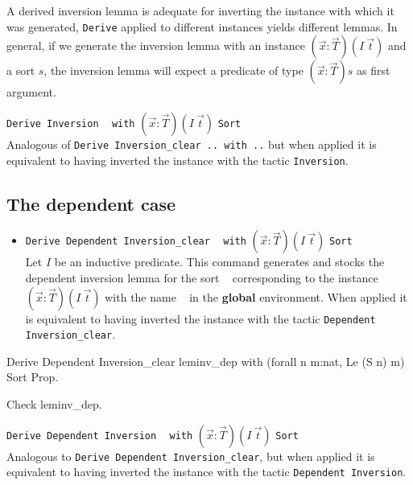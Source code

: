 A derived inversion lemma is  adequate for inverting the instance
with which it was generated,  \texttt{Derive} applied to
different instances yields different lemmas. In general, if we generate
the inversion lemma with 
an instance $(\vec{x}:\vec{T})(I~\vec{t})$ and a sort $s$,  the inversion lemma will
expect a predicate of type $(\vec{x}:\vec{T})s$ as first argument. \\

\begin{Variant}
\item \texttt{Derive Inversion} \ident~ \texttt{with} 
  $(\vec{x}:\vec{T})(I~\vec{t})$ \texttt{Sort} \sort\\ 
     Analogous of \texttt{Derive Inversion\_clear .. with ..} but 
 when applied it is equivalent to having
  inverted the instance with the tactic \texttt{Inversion}.
\end{Variant}

\subsection{The dependent case}
\begin{itemize}
\item \texttt{Derive Dependent Inversion\_clear} \ident~ \texttt{with}
  $(\vec{x}:\vec{T})(I~\vec{t})$ \texttt{Sort} \sort~ \\ 
  Let $I$ be an inductive predicate. This command generates and stocks
  the dependent inversion lemma for the sort  \sort~  corresponding to the instance
  $(\vec{x}:\vec{T})(I~\vec{t})$ with the name \ident~ in the {\bf
    global} environment. When applied it is equivalent to having
  inverted the instance with the tactic \texttt{Dependent Inversion\_clear}.
\end{itemize}

\begin{coq_example}
Derive Dependent Inversion_clear leminv_dep with
 (forall n m:nat, Le (S n) m) Sort Prop.
\end{coq_example}

\begin{coq_example}
Check leminv_dep.
\end{coq_example}

\begin{Variants}
\item \texttt{Derive Dependent Inversion} \ident~ \texttt{with}
  $(\vec{x}:\vec{T})(I~\vec{t})$ \texttt{Sort} \sort~ \\ 
  Analogous to \texttt{Derive Dependent Inversion\_clear}, but when
  applied  it is equivalent to having
  inverted the instance with the tactic \texttt{Dependent Inversion}.

\end{Variants}

